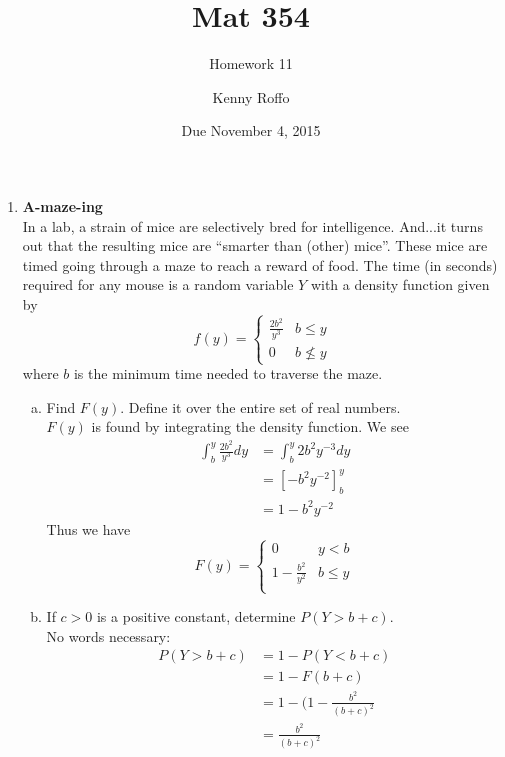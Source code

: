 \documentclass{scrartcl}
\title{Mat 354}
\subtitle{Homework 11}
\author{Kenny Roffo}
\date{Due November 4, 2015}
\begin{document}
\maketitle

\begin{enumerate}

\item \textbf{A-maze-ing}\\
In a lab, a strain of mice are selectively bred for intelligence. And...it turns out that the resulting mice are “smarter than (other) mice”. These mice are timed going through a maze to reach a reward of food. The time (in seconds) required for any mouse is a random variable $Y$ with a density function given by 
\begin{displaymath}
f(y) = \begin{cases} 
  \frac{2b^2}{y^3} & b \le y \\
  0 & b \nleq y
\end{cases}
\end{displaymath}
where $b$ is the minimum time needed to traverse the maze.
\begin{enumerate}[a)]
  \item Find $F(y)$. Define it over the entire set of real numbers.\\

    $F(y)$ is found by integrating the density function. We see
    \begin{align*}
      \int_b^y\frac{2b^2}{y^3}dy &= \int_b^y2b^2y^{-3}dy\\
      &= \left[-b^2y^{-2}\right]_b^y\\
      &= 1 - b^2y^{-2}
    \end{align*}
    Thus we have
    \begin{displaymath}
      F(y) = 
      \begin{cases}
        0 & y < b\\
        1 - \frac{b^2}{y^2} & b \le y\\
      \end{cases}
    \end{displaymath}\pagebreak

  \item If $c > 0$ is a positive constant, determine $P(Y > b + c)$.\\
    No words necessary:
    \begin{align*}
      P(Y>b+c) &= 1 - P(Y<b+c)\\
      &= 1 - F(b+c)\\
      &= 1 - (1 - \frac{b^2}{(b+c)^2}\\
      &= \frac{b^2}{(b+c)^2}
    \end{align*}


\end{enumerate}
\end{enumerate}
\end{document}
